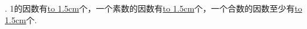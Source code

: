 . 1的因数有\underline{\hbox to 1.5cm{}}个，一个素数的因数有\underline{\hbox to 1.5cm{}}个，一个合数的因数至少有\underline{\hbox to 1.5cm{}}个.